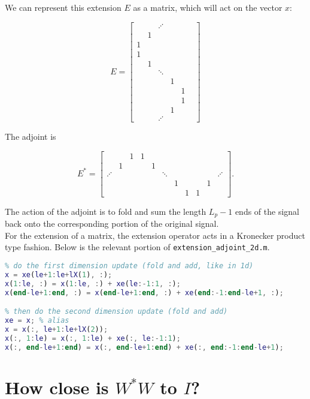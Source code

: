 \documentclass{article}
\theoremstyle{mystuff}
\theoremstyle{myexample}
\theoremstyle{named}
\begin{document}
\noindent We can represent this extension $E$ as a matrix, which will act on the vector $x$:

\[ E = \begin{bmatrix} & & \iddots & & &\\ & 1 &&&&\\ 1&&&&&\\1&&&&\\&1&&&&\\&&\ddots&&&\\&&&1&\\&&&&1\\&&&&1\\&&&1&\\&&\iddots&&\end{bmatrix} \] 

The adjoint is

\[ E^\ast = \begin{bmatrix}
            &&1&1&&&&&&&\\
            &1&&&1&&&&&&\\
            \iddots&&&&&\ddots&&&&&\iddots\\
            &&&&&&1&&&1&\\
            &&&&&&&1&1&&
            \end{bmatrix}. \] 

\noindent The action of the adjoint is to fold and sum the length $L_p-1$ ends of the signal back onto the corresponding portion of the original signal.\\

For the extension of a matrix, the extension operator acts in a Kronecker product type fashion.  Below is the relevant portion of \verb|extension_adjoint_2d.m|.

\begin{lstlisting}[language=matlab]
% this feels like a Kronecker product
% do the first dimension update (fold and add, like in 1d)
x = xe(le+1:le+lX(1), :);
x(1:le, :) = x(1:le, :) + xe(le:-1:1, :);
x(end-le+1:end, :) = x(end-le+1:end, :) + xe(end:-1:end-le+1, :);

% then do the second dimension update (fold and add)
xe = x; % alias
x = x(:, le+1:le+lX(2));
x(:, 1:le) = x(:, 1:le) + xe(:, le:-1:1);
x(:, end-le+1:end) = x(:, end-le+1:end) + xe(:, end:-1:end-le+1);
\end{lstlisting}





\section{How close is $W^\ast W$ to $I$?}
\end{document}

